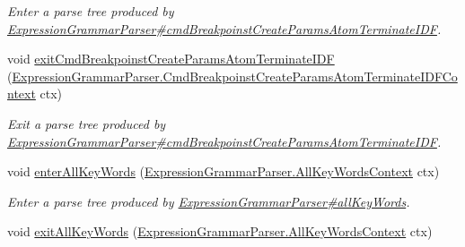 \begin{DoxyCompactItemize}
\begin{DoxyCompactList}\small\item\em Enter a parse tree produced by \hyperlink{classgov_1_1nasa_1_1jpf_1_1inspector_1_1server_1_1expression_1_1parser_1_1_expression_grammar_parser_a67979d89277e44ddae7fa8ab4a4d8cfb}{Expression\+Grammar\+Parser\#cmd\+Breakpoinst\+Create\+Params\+Atom\+Terminate\+I\+DF}. \end{DoxyCompactList}\item 
void \hyperlink{interfacegov_1_1nasa_1_1jpf_1_1inspector_1_1server_1_1expression_1_1parser_1_1_expression_grammar_listener_a3ee0a4cdd7380ad99cf908ebfda59575}{exit\+Cmd\+Breakpoinst\+Create\+Params\+Atom\+Terminate\+I\+DF} (\hyperlink{classgov_1_1nasa_1_1jpf_1_1inspector_1_1server_1_1expression_1_1parser_1_1_expression_grammar_pa33db42909734e187834b73b54c5beb59}{Expression\+Grammar\+Parser.\+Cmd\+Breakpoinst\+Create\+Params\+Atom\+Terminate\+I\+D\+F\+Context} ctx)
\begin{DoxyCompactList}\small\item\em Exit a parse tree produced by \hyperlink{classgov_1_1nasa_1_1jpf_1_1inspector_1_1server_1_1expression_1_1parser_1_1_expression_grammar_parser_a67979d89277e44ddae7fa8ab4a4d8cfb}{Expression\+Grammar\+Parser\#cmd\+Breakpoinst\+Create\+Params\+Atom\+Terminate\+I\+DF}. \end{DoxyCompactList}\item 
void \hyperlink{interfacegov_1_1nasa_1_1jpf_1_1inspector_1_1server_1_1expression_1_1parser_1_1_expression_grammar_listener_a16c7955eefc07102512218086abfabc5}{enter\+All\+Key\+Words} (\hyperlink{classgov_1_1nasa_1_1jpf_1_1inspector_1_1server_1_1expression_1_1parser_1_1_expression_grammar_parser_1_1_all_key_words_context}{Expression\+Grammar\+Parser.\+All\+Key\+Words\+Context} ctx)
\begin{DoxyCompactList}\small\item\em Enter a parse tree produced by \hyperlink{classgov_1_1nasa_1_1jpf_1_1inspector_1_1server_1_1expression_1_1parser_1_1_expression_grammar_parser_a69f20b32ba4350fe916222aa4987d304}{Expression\+Grammar\+Parser\#all\+Key\+Words}. \end{DoxyCompactList}\item 
void \hyperlink{interfacegov_1_1nasa_1_1jpf_1_1inspector_1_1server_1_1expression_1_1parser_1_1_expression_grammar_listener_ad67670f16e5b1558ec0f7caaa4258203}{exit\+All\+Key\+Words} (\hyperlink{classgov_1_1nasa_1_1jpf_1_1inspector_1_1server_1_1expression_1_1parser_1_1_expression_grammar_parser_1_1_all_key_words_context}{Expression\+Grammar\+Parser.\+All\+Key\+Words\+Context} ctx)

\end{DoxyCompactItemize}
